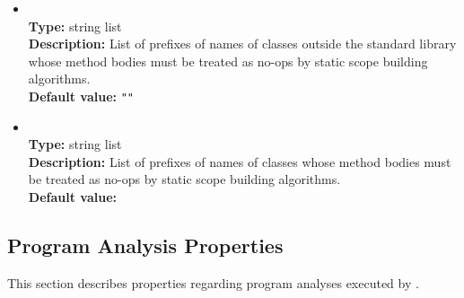 \begin{itemize}
\item
{} \\
{\bf Type:} string list \\
{\bf Description:} List of prefixes of names of classes outside the standard library whose method bodies must be treated as no-ops by static scope building algorithms. \\
{\bf Default value:} {\tt ""}

\item
{} \\
{\bf Type:} string list \\
{\bf Description:} List of prefixes of names of classes whose method bodies must be treated as no-ops by static scope building algorithms. \\
{\bf Default value:} 
\end{itemize}

\subsection{Program Analysis Properties}

This section describes properties regarding program analyses executed by \Chord.

